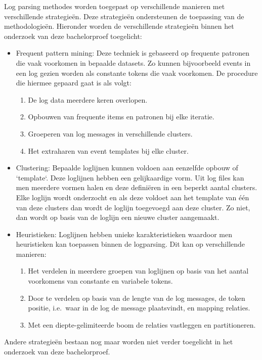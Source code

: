Log parsing methodes worden toegepast op verschillende manieren met verschillende strategieën. Deze strategieën ondersteunen de toepassing van de methodologieën. Hieronder worden de verschillende strategieën binnen het onderzoek van deze bachelorproef toegelicht:
\begin{itemize}
    \item Frequent pattern mining: Deze techniek is gebaseerd op frequente patronen die vaak voorkomen in bepaalde datasets.
    Zo kunnen bijvoorbeeld events in een log gezien worden als constante tokens die vaak voorkomen. De procedure die hiermee gepaard gaat is als volgt:
    \begin{enumerate}
        \item De log data meerdere keren overlopen.
        \item Opbouwen van frequente items en patronen bij elke iteratie.
        \item Groeperen van log messages in verschillende clusters.
        \item Het extraharen van event templates bij elke cluster. 
    \end{enumerate}

    \item Clustering: Bepaalde loglijnen kunnen voldoen aan eenzelfde opbouw of `template`. Deze loglijnen hebben een gelijkaardige vorm. Uit log files kan men meerdere vormen halen en deze definiëren in een beperkt aantal clusters. Elke loglijn wordt onderzocht en als deze voldoet aan het template van één van deze clusters dan wordt de loglijn toegevoegd aan deze cluster. Zo niet, dan wordt op basis van de loglijn een nieuwe cluster aangemaakt.\\
    
    \item Heuristieken: Loglijnen hebben unieke karakteristieken waardoor men heuristieken kan toepassen binnen de logparsing. Dit kan op verschillende manieren:
    \begin{enumerate}
        \item Het verdelen in meerdere groepen van loglijnen op basis van het aantal voorkomens van constante en variabele tokens.
        \item Door te verdelen op basis van de lengte van de log messages, de token positie, i.e.\ waar in de log de message plaatsvindt, en mapping relaties.
        \item Met een diepte-gelimiteerde boom de relaties vastleggen en partitioneren.
    \end{enumerate}

\end{itemize}
Andere strategieën bestaan nog maar worden niet verder toegelicht in het onderzoek van deze bachelorproef.

